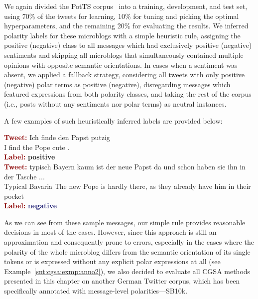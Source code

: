 We again divided the PotTS corpus~\cite{Sidarenka:16} into a training,
development, and test set, using 70\% of the tweets for learning, 10\%
for tuning and picking the optimal hyperparameters, and the remaining
20\% for evaluating the results.  We inferred polarity labels for
these microblogs with a simple heuristic rule, assigning the positive
(negative) class to all messages which had exclusively positive
(negative) sentiments and skipping all microblogs that simultaneously
contained multiple opinions with opposite semantic orientations.  In
cases when a sentiment was absent, we applied a fallback strategy,
considering all tweets with only positive (negative) polar terms as
positive (negative), disregarding messages which featured expressions
from both polarity classes, and taking the rest of the corpus (i.e.,
posts without any sentiments nor polar terms) as neutral instances.

A few examples of such heuristically inferred labels are provided
below:
\begin{example}\label{snt:cgsa:exmp:anno1}
  \noindent\textup{\bfseries\textcolor{darkred}{Tweet:}} {\upshape Ich finde den Papst putzig \smiley{}}\\
  \noindent I find the Pope cute \smiley{}.\\
  \noindent\textup{\bfseries\textcolor{darkred}{Label:}}\hspace*{2em}\textbf{%
    \upshape\textcolor{green3}{positive}}\\[1.5em]
  \noindent\textup{\bfseries\textcolor{darkred}{Tweet:}} {\upshape typisch Bayern kaum ist der neue Papst da und schon haben
  sie ihn in der Tasche ...}\\
  \noindent Typical Bavaria The new Pope is hardly there, as they already have him in their pocket\\
  \noindent\textup{\bfseries\textcolor{darkred}{Label:}}\hspace*{2em}\textbf{%
    \upshape\textcolor{midnightblue}{negative}}
\end{example}
As we can see from these sample messages, our simple rule provides
reasonable decisions in most of the cases.  However, since this
approach is still an approximation and consequently prone to errors,
especially in the cases where the polarity of the whole microblog
differs from the semantic orientation of its single tokens or is
expressed without any explicit polar expressions at all (see
Example~\ref{snt:cgsa:exmp:anno2}), we also decided to evaluate all
CGSA methods presented in this chapter on another German Twitter
corpus, which has been specifically annotated with message-level
polarities---SB10k.

